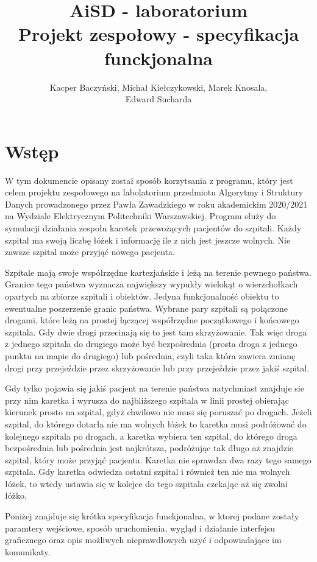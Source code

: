 \documentclass[10pt,a4paper]{article}
\title{\huge AiSD - laboratorium \\ \Large Projekt zespołowy - specyfikacja funckjonalna}
\author{Kacper Baczyński, Michał Kiełczykowski, Marek Knosala, \\ Edward Sucharda}
\begin{document}
\maketitle

\section{Wstęp}

W tym dokumencie opisany został sposób korzytsania z programu, który jest celem projektu zespołowego na labolatorium przedmiotu Algorytmy i Struktury Danych prowadzonego przez Pawła Zawadzkiego w roku akademickim 2020/2021 na Wydziale Elektrycznym Politechniki Warszawskiej. Program służy do symulacji działania zespołu karetek przewożących pacjentów do szpitali. Każdy szpital ma swoją liczbę łóżek i informację ile z nich jest jeszcze wolnych. Nie zawsze szpital może przyjąć nowego pacjenta.

Szpitale mają swoje współrzędne kartezjańskie i leżą na terenie pewnego państwa. Granice tego państwa wyznacza największy wypukły wielokąt o wierzchołkach opartych na zbiorze szpitali i obiektów. Jedyna funkcjonalność obiektu to ewentualne poszerzenie granic państwa. Wybrane pary szpitali są połączone drogami, które leżą na prostej łączącej współrzędne początkowego i końcowego szpitala. Gdy dwie drogi przecinają się to jest tam skrzyżowanie. Tak więc droga z jednego szpitala do drugiego może być bezpośrednia (prosta droga z jednego punktu na mapie do drugiego) lub pośrednia, czyli taka która zawiera zmianę drogi przy przejeździe przez skrzyżowanie lub przy przejeździe przez jakiś szpital.

Gdy tylko pojawia się jakiś pacjent na terenie państwa natychmiast znajduje sie przy nim karetka i wyrusza do najbliższego szpitala w linii prostej obierając kierunek prosto na szpital, gdyż chwilowo nie musi się poruszać po drogach. Jeżeli szpital, do którego dotarła nie ma wolnych łóżek to karetka musi podróżować do kolejnego szpitala po drogach, a karetka wybiera ten szpital, do którego droga bezpośrednia lub pośrednia jest najkrótsza, podróżując tak długo aż znajdzie szpital, który może przyjąć pacjenta. Karetka nie sprawdza dwa razy tego samego szpitala. Gdy karetka odwiedza ostatni szpital i również ten nie ma wolnych łóżek, to wtedy ustawia się w kolejce do tego szpitala czekając aż się zwolni łóżko.

Poniżej znajduje się krótka specyfikacja funckjonalna, w ktorej podane zostały paramtery wejściowe, sposób uruchomienia, wygląd i działanie interfejsu graficznego oraz opis możliwych nieprawdłowych użyć i odpowiadające im komunikaty.
\end{document}
